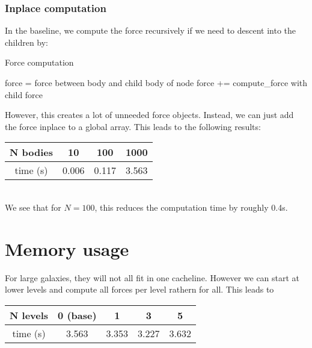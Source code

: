 \documentclass[a4paper]{scrartcl}
\begin{document}
        \subsubsection{Inplace computation}
            In the baseline, we compute the force recursively if we need to descent into the children by:
            \begin{algorithm}[H]
                \caption{Force computation}\label{euclid}
                \begin{algorithmic}[1]
                    \State force = force between body and child body of node
                \Else      
                        \State force += compute\_force with child
                \EndFor
                \EndIf
                \State \Return force
                \EndProcedure
                \end{algorithmic}
            \end{algorithm}
            However, this creates a lot of unneeded force objects. Instead, we
            can just add the force inplace to a global array. This leads to the
            following results:\\
            \noindent\begin{tabular}{c|c|c|c}
                N bodies & 10 & 100 & 1000 \\
                \hline
                time (s) & 0.006 & 0.117 & 3.563\\
            \end{tabular}\\
            We see that for $N=100$, this reduces the computation time by
            roughly 0.4s.

        \section{Memory usage}
            For large galaxies, they will not all fit in one cacheline. However
            we can start at lower levels and compute all forces per level rathern for all.
            This leads to\\
            \noindent\begin{tabular}{c|c|c|c|c}
                N levels & 0 (base) & 1 & 3 & 5 \\
                \hline
                time (s) &  3.563 & 3.353 & 3.227 & 3.632\\
            \end{tabular}
\end{document}
